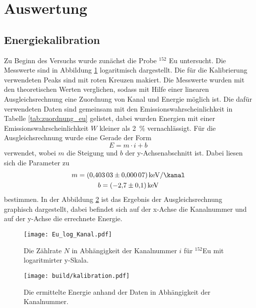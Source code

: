 \newpage
\section{Auswertung}
\label{sec:Auswertung}

\subsection{Energiekalibration}
\label{sec:Energiekalibration}
Zu Beginn des Versuchs wurde zunächst die Probe ${}^{152}$ Eu untersucht. Die Messwerte
sind in Abbildung \ref{fig:Eu_log_Kanal} logaritmisch dargestellt.
Die für die Kalibrierung verwendeten Peaks sind mit roten Kreuzen makiert. Die Messwerte
wurden mit den theoretischen Werten verglichen, sodass mit Hilfe einer linearen Ausgleichsrechnung
eine Zuordnung von Kanal und Energie möglich ist. Die dafür verwendeten Daten sind
gemeinsam mit den Emissionswahrscheinlichkeit in Tabelle \ref{tab:zuordnung_eu}
gelistet, dabei wurden Energien mit einer Emissionswahrscheinlichkeit $W$
kleiner als \SI{2}{\percent} vernachlässigt. Für die Ausgleichsrechnung wurde
eine Gerade der Form
\begin{equation}
  E = m \cdot i + b
\end{equation}
verwendet, wobei $m$ die Steigung und $b$ der y-Achsenabschnitt ist. Dabei liesen sich die Parameter zu
\begin{gather}
  m = \SI{0.40303(7)}{\kilo\electronvolt\per\kanal} \\
  b = \SI{-2.7(1)}{\kilo\electronvolt}
\end{gather}
bestimmen.
In der Abbildung \ref{fig:kalibration} ist das Ergebnis der Ausgleichsrechnung graphisch
dargestellt, dabei befindet sich auf der x-Achse die Kanalnummer und auf der
y-Achse die errechnete Energie.

\begin{figure}
 \centering
 \texttt{[image: Eu\_log\_Kanal.pdf]}
 \caption{Die Zählrate $N$ in Abhängigkeit der Kanalnummer $i$ für ${}^{152}$Eu mit logaritmirter y-Skala.}
 \label{fig:Eu_log_Kanal}
\end{figure}

\begin{figure}
 \centering
 \texttt{[image: build/kalibration.pdf]}
 \caption{Die ermittelte Energie anhand der Daten in Abhängigkeit der Kanalnummer.}
 \label{fig:kalibration}
\end{figure}





